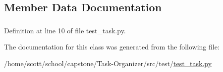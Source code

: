 \subsection{\-Member \-Data \-Documentation}
\hypertarget{classtest__task_1_1TestTask_ac2f3d00c02fd9907ce4427cc1b0c968f}{
\subsubsection[{my\-\_\-task}]{}}
\label{classtest__task_1_1TestTask_ac2f3d00c02fd9907ce4427cc1b0c968f}


\-Definition at line 10 of file test\-\_\-task.\-py.



\-The documentation for this class was generated from the following file\-:\begin{DoxyCompactItemize}
\item 
/home/scott/school/capstone/\-Task-\/\-Organizer/src/test/\hyperlink{test__task_8py}{test\-\_\-task.\-py}\end{DoxyCompactItemize}
